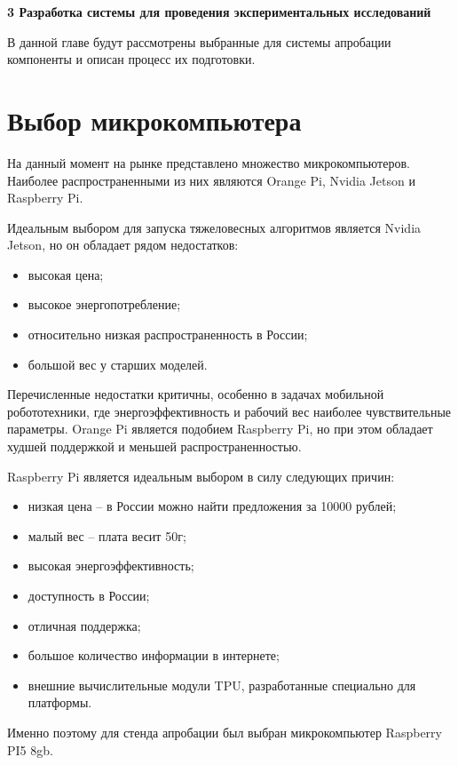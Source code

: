 \newpage
\begin{flushleft}
  \textbf{\large 3 Разработка системы для проведения экспериментальных исследований }
\end{flushleft}
В данной главе будут рассмотрены выбранные для системы апробации компоненты и описан процесс их подготовки.

\section{Выбор микрокомпьютера}
На данный момент на рынке представлено множество микрокомпьютеров. Наиболее распространенными из них являются Orange Pi, Nvidia Jetson и Raspberry Pi. 

Идеальным выбором для запуска тяжеловесных алгоритмов является Nvidia Jetson, но он обладает рядом недостатков:
\begin{itemize}
  \item высокая цена;
  \item высокое энергопотребление;
  \item относительно низкая распространенность в России;
  \item большой вес у старших моделей.
\end{itemize}

Перечисленные недостатки критичны, особенно в задачах мобильной робототехники, где энергоэффективность и рабочий вес наиболее чувствительные параметры. 
Orange Pi является подобием Raspberry Pi, но при этом обладает худшей поддержкой и меньшей распространенностью. 

Raspberry Pi является идеальным выбором в силу следующих причин:
\begin{itemize}
  \item низкая цена -- в России можно найти предложения за 10000 рублей;
  \item малый вес -- плата весит 50г;
  \item высокая энергоэффективность;
  \item доступность в России;
  \item отличная поддержка;
  \item большое количество информации в интернете;
  \item внешние вычислительные модули TPU, разработанные специально для платформы. 
\end{itemize}

Именно поэтому для стенда апробации был выбран микрокомпьютер Raspberry PI5 8gb.

